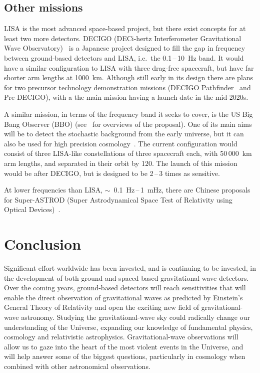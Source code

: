 \documentclass{article}
\newcommand{\muHz}{\textmu\hspace{-0.2pt}Hz\xspace}
\begin{document}
\subsection{Other missions}

LISA is the most advanced space-based project, but there exist concepts for at
least two more detectors. DECIGO (DECi-hertz Interferometer Gravitational Wave
Observatory)~\cite{Sato:2009, Kawamura:2011} is a Japanese project designed to
fill the gap in frequency between ground-based detectors and LISA, i.e.\, the
0.1\,--\,10~Hz band. It would have a similar configuration to LISA with three
drag-free spacecraft, but have far shorter arm lengths at 1000~km. Although
still early in its design there are plans for two precursor technology
demonstration missions (DECIGO Pathfinder~\cite{Ando:2009} and Pre-DECIGO), with
a the main mission having a launch date in the mid-2020s.

A similar mission, in terms of the frequency band it seeks to cover, is the US
Big Bang Observer (BBO) (see~\cite{Crowder:2005, Cutler:2009, Harry:2006} for
overviews of the proposal). One of its main aims will be to detect the
stochastic background from the early universe, but it can also be used for high
precision cosmology~\cite{Cutler:2009}. The current configuration would consist
of three LISA-like constellations of three spacecraft each, with 50\,000~km arm
lengths, and separated in their orbit by 120\textdegree. The launch of this
mission would be after DECIGO, but is designed to be 2\,--\,3 times as sensitive.

At lower frequencies than LISA, $\sim$~0.1~\muHz\,--\,1~mHz, there are Chinese
proposals for Super-ASTROD (Super Astrodynamical Space Test of
Relativity using Optical Devices)~\cite{Ni:2009}.




\section{Conclusion}
\label{section:conclusion}

Significant effort worldwide has been invested, and is continuing to be
invested, in the development of both ground and spaced based gravitational-wave
detectors. Over the coming years, ground-based detectors will reach
sensitivities that will enable the direct observation of gravitational waves as
predicted by Einstein's General Theory of Relativity and open the exciting new
field of gravitational-wave astronomy. Studying the gravitational-wave
sky could radically change our understanding of the Universe, expanding our
knowledge of fundamental physics, cosmology and relativistic astrophysics.
Gravitational-wave observations will allow us to gaze into the heart of the most
violent events in the Universe, and will help answer some of the biggest
questions, particularly in cosmology when combined with other astronomical
observations.
\end{document}
